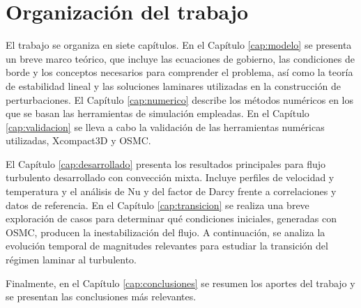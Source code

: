 \section{Organización del trabajo}

El trabajo se organiza en siete capítulos. En el Capítulo \ref{cap:modelo} se presenta un breve marco teórico, que incluye las ecuaciones de gobierno, las condiciones de borde y los conceptos necesarios para comprender el problema, así como la teoría de estabilidad lineal y las soluciones laminares utilizadas en la construcción de perturbaciones. El Capítulo \ref{cap:numerico} describe los métodos numéricos en los que se basan las herramientas de simulación empleadas. En el Capítulo \ref{cap:validacion} se lleva a cabo la validación de las herramientas numéricas utilizadas, Xcompact3D y OSMC.

El Capítulo \ref{cap:desarrollado} presenta los resultados principales para flujo turbulento desarrollado con convección mixta. Incluye perfiles de velocidad y temperatura y el análisis de Nu y del factor de Darcy frente a correlaciones y datos de referencia. En el Capítulo \ref{cap:transicion} se realiza una breve exploración de casos para determinar qué condiciones iniciales, generadas con OSMC, producen la inestabilización del flujo. A continuación, se analiza la evolución temporal de magnitudes relevantes para estudiar la transición del régimen laminar al turbulento.

Finalmente, en el Capítulo \ref{cap:conclusiones} se resumen los aportes del trabajo y se presentan las conclusiones más relevantes.